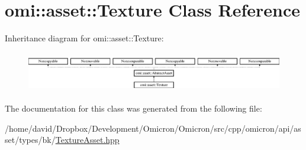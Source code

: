 \hypertarget{classomi_1_1asset_1_1_texture}{}\section{omi\+:\+:asset\+:\+:Texture Class Reference}
\label{classomi_1_1asset_1_1_texture}
Inheritance diagram for omi\+:\+:asset\+:\+:Texture\+:\begin{figure}[H]
\begin{center}
\leavevmode
\includegraphics[height=1.772152cm]{classomi_1_1asset_1_1_texture}
\end{center}
\end{figure}


The documentation for this class was generated from the following file\+:\begin{DoxyCompactItemize}
\item 
/home/david/\+Dropbox/\+Development/\+Omicron/\+Omicron/src/cpp/omicron/api/asset/types/bk/\hyperlink{_texture_asset_8hpp}{Texture\+Asset.\+hpp}\end{DoxyCompactItemize}
